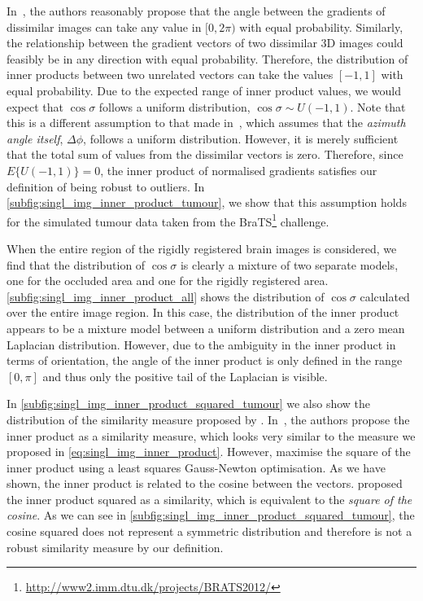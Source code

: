 In~\cite{tzimiropoulos2012subspace,tzimiropoulos2010robust},
the authors reasonably propose that the angle between the
gradients of dissimilar images can take any value in $[0, 2\pi)$ with equal
probability. Similarly, the relationship between the gradient vectors of two
dissimilar 3D images could feasibly be in any direction with equal probability.
Therefore, the distribution of inner products between two unrelated vectors can
take the values $[-1, 1]$ with equal probability. Due to the expected range of
inner product values, we would expect that $\cos{\sigma}$ follows a uniform
distribution, $\cos{\sigma} \sim U(-1, 1)$. Note that this is a different
assumption to that made in~\cite{tzimiropoulos2011robust}, which assumes that the
\textit{azimuth angle itself}, $\Delta \phi$, follows a uniform distribution.
However, it is merely sufficient that the total sum of values from the
dissimilar vectors is zero. Therefore, since $E\{U(-1, 1)\} = 0$, the inner
product of normalised gradients satisfies our definition of being robust to
outliers. In \cref{subfig:singl_img_inner_product_tumour}, we show that this
assumption holds for the simulated tumour data taken from the
BraTS\footnote{\url{http://www2.imm.dtu.dk/projects/BRATS2012/}} challenge.

When the entire region of the rigidly registered brain images is considered, we
find that the distribution of $\cos{\sigma}$ is clearly a mixture of two
separate models, one for the occluded area and one for the rigidly registered
area. \cref{subfig:singl_img_inner_product_all} shows the distribution of
$\cos{\sigma}$ calculated over the entire image region. In this case, the
distribution of the inner product appears to be a mixture model between a
uniform distribution and a zero mean Laplacian distribution. However, due to the
ambiguity in the inner product in terms of orientation, the angle of the inner
product is only defined in the range $[0, \pi]$ and thus only the positive tail
of the Laplacian is visible.

In \cref{subfig:singl_img_inner_product_squared_tumour} we also show the
distribution of the similarity measure proposed by \citet{haber2006intensity}.
In~\cite{haber2006intensity}, the authors propose the inner product as a
similarity measure, which looks very similar to the measure we proposed in
\cref{eq:singl_img_inner_product}.
However, \citet{haber2006intensity} maximise the square of the
inner product using a least squares Gauss-Newton optimisation. As we have shown,
the inner product is related to the cosine between the vectors.
\citet{haber2006intensity} proposed the inner product squared as
a similarity, which is equivalent to the \textit{square of the cosine}. As we
can see in \cref{subfig:singl_img_inner_product_squared_tumour}, the cosine squared
does not represent a symmetric distribution and therefore is not a robust
similarity measure by our definition.
